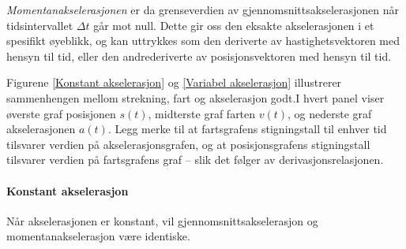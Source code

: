 \textit{Momentanakselerasjonen} er da grenseverdien av gjennomsnittsakselerasjonen når tidsintervallet $\Delta t$ går mot null. Dette gir oss den eksakte akselerasjonen i et spesifikt øyeblikk, og kan uttrykkes som den deriverte av hastighetsvektoren med hensyn til tid, eller den andrederiverte av posisjonsvektoren med hensyn til tid.

Figurene \ref{Konstant akselerasjon} og \ref{Variabel akselerasjon} illustrerer sammenhengen mellom strekning, fart og akselerasjon godt.I hvert panel viser øverste graf posisjonen $s(t)$, midterste graf farten $v(t)$, og nederste graf akselerasjonen $a(t)$. Legg merke til at fartsgrafens stigningstall til enhver tid tilsvarer verdien på akselerasjonsgrafen, og at posisjonsgrafens stigningstall tilsvarer verdien på fartsgrafens graf – slik det følger av derivasjonsrelasjonen.

\paragraph{Konstant akselerasjon}Når akselerasjonen er konstant, vil gjennomsnittsakselerasjon og momentanakselerasjon være identiske. 



